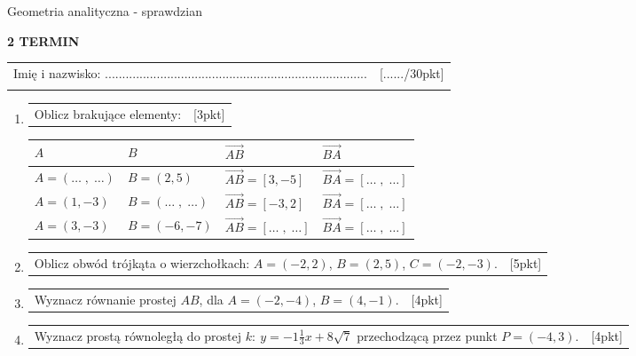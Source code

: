 \documentclass[12pt,a4paper]{article}
\begin{document}
	\begin{center}
		\LARGE Geometria analityczna - sprawdzian
	\end{center}
	\vspace{1.5cm}
	\begin{flushright}
		\textbf{2 TERMIN}
	\end{flushright}
	\begin{tabular}{p{13cm} r}
		Imię i nazwisko: ............................................................................
		&[....../30pkt]\\ 
		\vspace{0.5cm}
	\end{tabular}
	\begin{enumerate}[1.]
		\item  \begin{tabular}{p{13cm} r}
			Oblicz brakujące elementy: &[3pkt]\\ 
		\end{tabular}
		
		\begin{tabular}{|p{3cm} |p{3cm} |p{3cm} |p{3cm}|}
			\hline
			$A$ & $B$ & $\overrightarrow{AB}$ & $\overrightarrow{BA}$\\ 
			\hline
			$A=(\dots\;,\;\dots)$ & $B=(2,5)$ & $\overrightarrow{AB}=[3,-5]$ & $\overrightarrow{BA}=[\dots\;,\;\dots]$\\ 
			\hline
			$A=(1,-3)$ & $B=(\dots\;,\;\dots)$ & $\overrightarrow{AB}=[-3,2]$ & $\overrightarrow{BA}=[\dots\;,\;\dots]$\\ 
			\hline
			$A=(3,-3)$ & $B=(-6,-7)$ & $\overrightarrow{AB}=[\dots\;,\;\dots]$ & $\overrightarrow{BA}=[\dots\;,\;\dots]$\\ 
			\hline
		\end{tabular}
		
		\item  \begin{tabular}{p{13cm} r}
			Oblicz obwód trójkąta o wierzchołkach: \newline $A=(-2,2)$, $B=(2,5)$, $C=(-2,-3)$. &[5pkt]\\ 
		\end{tabular}
		
		\item \begin{tabular}{p{13cm} r}
			Wyznacz równanie prostej $AB$, dla $A=(-2,-4)$, $B=(4,-1)$. &[4pkt]\\ 
		\end{tabular}
		
		\item \begin{tabular}{p{13cm} r}
			Wyznacz prostą równoległą do prostej $k: \: y=-1\frac{1}{3}x+8\sqrt{7}$ przechodzącą przez punkt $P=(-4,3)$.&[4pkt]\\ 
		\end{tabular}
		

\end{enumerate}
\end{document}
